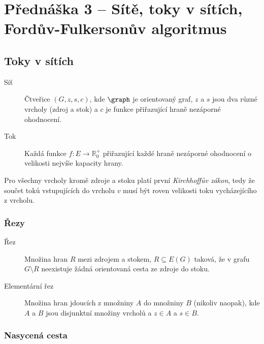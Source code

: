 \section{Přednáška 3 -- Sítě, toky v sítích, Fordův-Fulkersonův algoritmus}

\subsection{Toky v sítích}

\begin{description}
    \item[Síť] Čtveřice $(G, z, s, c)$, kde $\graph$ je orientovaný graf, $z$ a $s$ jsou dva různé vrcholy (zdroj a stok) a $c$ je funkce přiřazující hraně nezáporné ohodnocení.
    \item[Tok] Každá funkce $ f: E \to \mathbb{R}_0^+ $ přiřazující každé hraně nezáporné ohodnocení o velikosti nejvíše kapacity hrany.
\end{description}

Pro všechny vrcholy kromě zdroje a stoku platí první \textit{Kirchhoffův zákon}, tedy že součet toků vstupujících do vrcholu $v$ musí být roven velikosti toku vycházejícího z vrcholu.

\subsubsection{Řezy}

\begin{description}
    \item[Řez] Množina hran $R$ mezi zdrojem a stokem, $R \subseteq E(G)$ taková, že v grafu $G \setminus R$ neexistuje žádná orientovaná cesta ze zdroje do stoku.
    \item[Elementární řez] Množina hran jdoucích z množniny $A$ do množniny $B$ (nikoliv naopak), kde $A$ a $B$ jsou disjunktní množiny vrcholů a $z \in A$ a $s \in B$.
\end{description}

\label{lemma:hlavni-veta-o-tocich}



\subsubsection{Nasycená cesta}

